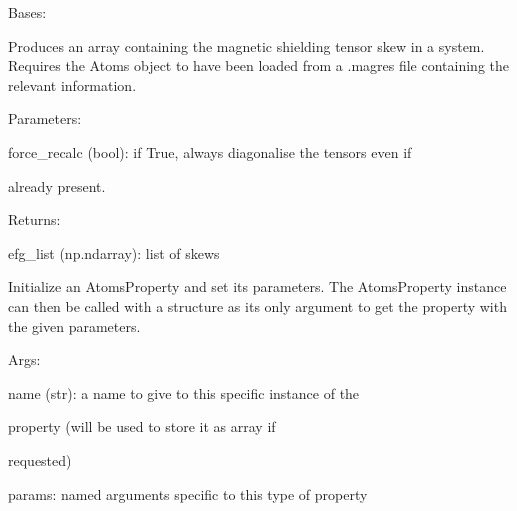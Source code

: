 \documentclass[letterpaper,10pt,english]{sphinxmanual}
\begin{document}
\begin{fulllineitems}
\label{doctree/soprano.properties.nmr.efg:soprano.properties.nmr.efg.EFGSkew}
Bases: {\hyperref[doctree/soprano.properties.atomsproperty:soprano.properties.atomsproperty.AtomsProperty]{}}

Produces an array containing the magnetic shielding tensor skew
in a system.
Requires the Atoms object to have been loaded from a .magres file
containing the relevant information.

\begin{DUlineblock}{0em}
\item[] Parameters:
\item[]
\begin{DUlineblock}{\DUlineblockindent}
\item[] force\_recalc (bool): if True, always diagonalise the tensors even if
\item[]
\begin{DUlineblock}{\DUlineblockindent}
\item[] already present.
\end{DUlineblock}
\end{DUlineblock}
\end{DUlineblock}

\begin{DUlineblock}{0em}
\item[] Returns:
\item[]
\begin{DUlineblock}{\DUlineblockindent}
\item[] efg\_list (np.ndarray): list of skews
\end{DUlineblock}
\end{DUlineblock}

Initialize an AtomsProperty and set its parameters.
The AtomsProperty instance can then be called with a structure as its
only argument to get the property with the given parameters.

\begin{DUlineblock}{0em}
\item[] Args:
\item[]
\begin{DUlineblock}{\DUlineblockindent}
\item[] name (str): a name to give to this specific instance of the
\item[]
\begin{DUlineblock}{\DUlineblockindent}
\item[] property (will be used to store it as array if
\item[] requested)
\end{DUlineblock}
\item[] params: named arguments specific to this type of property
\end{DUlineblock}
\end{DUlineblock}


\end{fulllineitems}
\end{document}
